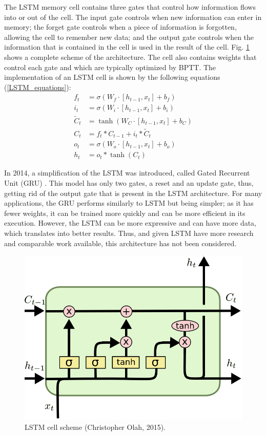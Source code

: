 \documentclass[10pt,twocolumn,letterpaper]{article}
\begin{document}
The LSTM memory cell contains three gates that control how information flows into or out of the cell. The input gate controls when new information can enter in memory; the forget gate controls when a piece of information is forgotten, allowing the cell to remember new data; and the output gate controls when the information that is contained in the cell is used in the result of the cell. Fig. \ref{fig:LSTM_cell} shows a complete scheme of the architecture. The cell also contains weights that control each gate and which are typically optimized by BPTT. The implementation of an LSTM cell is shown by the following equations (\ref{LSTM_equations}):
\begin{align} \label{LSTM_equations}
	f_t &= \sigma (W_f \cdot [h_{t-1}, x_t] + b_f) \nonumber \\
	i_t &= \sigma (W_i \cdot [h_{t-1}, x_t] + b_i) \nonumber \\
	\tilde{C}_t &= \tanh(W_C \cdot [h_{t-1}, x_t] + b_C) \nonumber \\
	C_t &= f_t * C_{t-1} + i_t * \tilde{C}_t \nonumber \\
	o_t &= \sigma (W_o \cdot [h_{t-1}, x_t] + b_o) \nonumber \\
	h_t &= o_t * \tanh(C_t)
\end{align}

In 2014, a simplification of the LSTM was introduced, called Gated Recurrent Unit (GRU) \cite{GRU}. This model has only two gates, a reset and an update gate, thus, getting rid of the output gate that is present in the LSTM architecture. For many applications, the GRU performs similarly to LSTM but being simpler; as it has fewer weights, it can be trained more quickly and can be more efficient in its execution. However, the LSTM can be more expressive and can have more data, which translates into better results. Thus, and given LSTM have more research and comparable work available, this architecture has not been considered.

\begin{figure}[!tbp]
  \centering
    \includegraphics[width=.36\textwidth]{LSTM.png}\hfill
    \caption{LSTM cell scheme (Christopher Olah, 2015).}
    \label{fig:LSTM_cell}
\end{figure}
\end{document}
